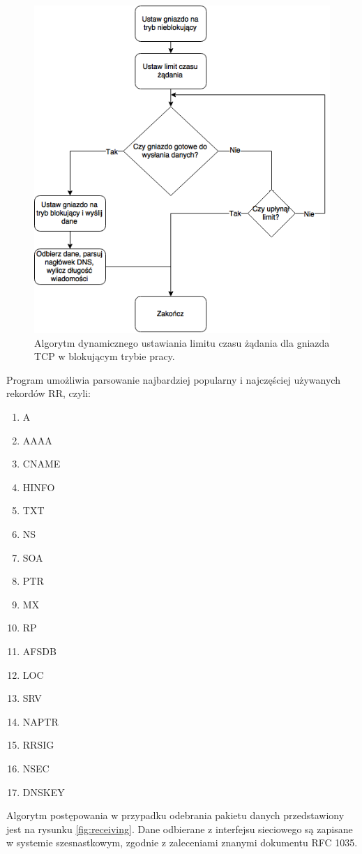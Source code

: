 \begin{figure}[ht]
	\centering
	\includegraphics[width=1.0\textwidth]{image/socketAlg}
	\caption{Algorytm dynamicznego ustawiania limitu czasu żądania dla gniazda TCP w blokującym trybie pracy.}
	\label{fig:socketAlg}
\end{figure}

Program umożliwia parsowanie najbardziej popularny i najczęściej używanych rekordów RR, czyli:
\begin{enumerate}
	\item A
	\item AAAA
	\item CNAME
	\item HINFO
	\item TXT
	\item NS
	\item SOA
	\item PTR
	\item MX
	\item RP
	\item AFSDB
	\item LOC
	\item SRV
	\item NAPTR
	\item RRSIG
	\item NSEC
	\item DNSKEY
\end{enumerate}
Algorytm postępowania w przypadku odebrania pakietu danych przedstawiony jest na rysunku \ref{fig:receiving}. Dane odbierane z interfejsu
sieciowego są zapisane w systemie szesnastkowym, zgodnie z zaleceniami znanymi dokumentu RFC 1035\cite{RFC1035}.

